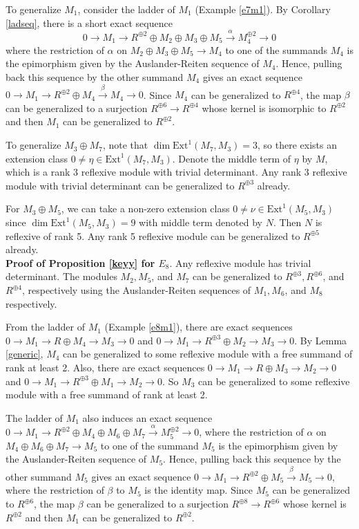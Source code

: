 \documentclass{amsart}[12pt]
\theoremstyle{definition}
\theoremstyle{remark}
\numberwithin{equation}{section}
\begin{document}
To generalize $M_1$, consider the ladder of $M_1$ (Example \ref{e7m1}). By Corollary \ref{ladseq}, there is a short exact sequence 
\[
0 \to M_1 \to R^{\oplus 2} \oplus M_2 \oplus M_3 \oplus M_5 \xrightarrow{\alpha} M_4^{\oplus 2} \to 0
\]
where the restriction of $\alpha$ on $M_2 \oplus M_3 \oplus M_5 \to M_4$ to one of the summands $M_4$ is the epimorphism given by the Auslander-Reiten sequence of $M_4$. Hence, pulling back this sequence by the other summand $M_4$ gives an exact sequence $0 \to M_1 \to R^{\oplus 2} \oplus M_4 \xrightarrow{\beta} M_4 \to 0$. Since $M_4$ can be generalized to $R^{\oplus 4}$, the map $\beta$ can be generalized to a surjection $R^{\oplus 6} \to R^{\oplus 4}$ whose kernel is isomorphic to $R^{\oplus 2}$ and then $M_1$ can be generalized to $R^{\oplus 2}$. 

To generalize $M_3 \oplus M_7$, note that $\dim \mathrm{Ext}^1(M_7, M_3) = 3$, so there exists an extension class $0 \neq \eta \in \mathrm{Ext}^1(M_7, M_3)$. Denote the middle term of $\eta$ by $M$, which is a rank 3 reflexive module with trivial determinant. Any rank 3 reflexive module with trivial determinant can be generalized to $R^{\oplus 3}$ already. 

For $M_3 \oplus M_5$, we can take a non-zero extension class $0 \neq \nu \in \mathrm{Ext}^1(M_5, M_3)$ since $\dim \mathrm{Ext}^1(M_5, M_3) = 9$ with middle term denoted by $N$. Then $N$ is reflexive of rank 5. Any rank 5 reflexive module can be generalized to $R^{\oplus 5}$ already. 
\\

\noindent \textbf{Proof of Proposition \ref{keyy} for $E_8$}.
Any reflexive module has trivial determinant. The modules $M_2, M_5$, and $M_7$ can be generalized to $R^{\oplus 3}, R^{\oplus 6}$, and $R^{\oplus 4}$, respectively using the Auslander-Reiten sequences of $M_1, M_6$, and $M_8$ respectively. 

From the ladder of $M_1$ (Example \ref{e8m1}), there are exact sequences $0 \to M_1 \to R \oplus M_4 \to M_3 \to 0$ and $0 \to M_1 \to R^{\oplus 3} \oplus M_2 \to M_3 \to 0$. By Lemma \ref{generic}, $M_4$ can be generalized to some reflexive module with a free summand of rank at least 2. Also, there are exact sequences $0 \to M_1 \to R \oplus M_3 \to M_2 \to 0$ and $0 \to M_1 \to R^{\oplus 3} \oplus M_1 \to M_2 \to 0$. So $M_3$ can be generalized to some reflexive module with a free summand of rank at least 2.

The ladder of $M_1$ also induces an exact sequence $0 \to M_1 \to R^{\oplus 2} \oplus M_4 \oplus M_6 \oplus M_7 \xrightarrow{\alpha} M_5^{\oplus 2} \to 0$, where the restriction of $\alpha$ on $M_4 \oplus M_6 \oplus M_7 \to M_5$ to one of the summand $M_5$ is the epimorphism given by the Auslander-Reiten sequence of $M_5$. Hence, pulling back this sequence by the other summand $M_5$ gives an exact sequence $0 \to M_1 \to R^{\oplus 2} \oplus M_5 \xrightarrow{\beta} M_5 \to 0$, where the restriction of $\beta$ to $M_5$ is the identity map. Since $M_5$ can be generalized to $R^{\oplus 6}$, the map $\beta$ can be generalized to a surjection $R^{\oplus 8} \to R^{\oplus 6}$ whose kernel is $R^{\oplus 2}$ and then $M_1$ can be generalized to $R^{\oplus 2}$. 
\end{document}
